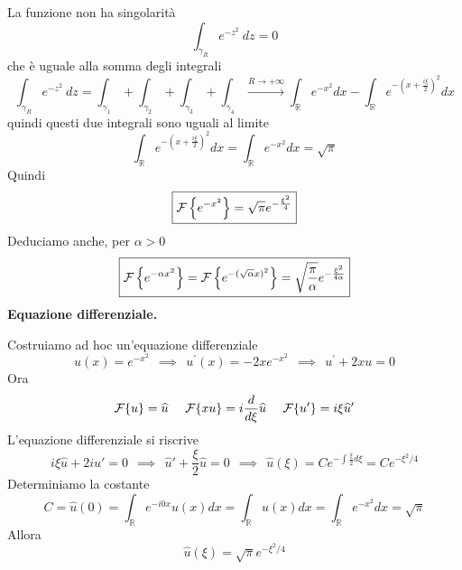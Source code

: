 La funzione non ha singolarità
\begin{equation*}
\int _{\gamma _{R}} e^{-z^{2}} \ dz=0
\end{equation*}
che è uguale alla somma degli integrali
\begin{equation*}
\int _{\gamma _{R}} e^{-z^{2}} \ dz=\int _{\gamma _{1}} +\int _{\gamma _{2}} +\int _{\gamma _{3}} +\int _{\gamma _{4}}\xrightarrow{R\rightarrow +\infty }\int _{\mathbb{R}} e^{-x^{2}} dx-\int _{\mathbb{R}} e^{-\left( x+\frac{i\xi }{2}\right)^{2}} dx
\end{equation*}
quindi questi due integrali sono uguali al limite
\begin{equation*}
\int _{\mathbb{R}} e^{-\left( x+\frac{i\xi }{2}\right)^{2}} dx=\int _{\mathbb{R}} e^{-x^{2}} dx=\sqrt{\pi }
\end{equation*}
Quindi
\begin{equation*}
\boxed{\mathcal{F} \left\{e^{-x^{2}}\right\} =\sqrt{\pi } e^{-\frac{\xi ^{2}}{4}}}
\end{equation*}
Deduciamo anche, per $\alpha  >0$
\begin{equation*}
\boxed{\mathcal{F} \left\{e^{-\alpha x^{2}}\right\} =\mathcal{F} \left\{e^{-(\sqrt{\alpha } x)^{2}}\right\} =\sqrt{\frac{\pi }{\alpha }} e^{-\frac{\xi ^{2}}{4\alpha }}}
\end{equation*}
\textbf{Equazione differenziale.}

Costruiamo ad hoc un'equazione differenziale
\begin{equation*}
u(x)=e^{-x^{2}} \ \ \implies \ \ u^{'} (x)=-2xe^{-x^{2}} \ \ \implies \ \ u^{'} +2xu=0
\end{equation*}
Ora
\begin{equation*}
\mathcal{F} \{u\} =\widehat{u} \ \ \ \ \mathcal{F} \{xu\} =i\frac{d}{d\xi }\widehat{u} \ \ \ \ \mathcal{F} \{u'\} =i\xi \widehat{u} '
\end{equation*}
L'equazione differenziale si riscrive
\begin{equation*}
i\xi \hat{u} +2i\hat{u} '=0\ \ \implies \ \ \hat{u} '+\frac{\xi }{2}\hat{u} =0\ \ \implies \ \ \hat{u}( \xi ) =Ce^{-\int \frac{\xi }{2} d\xi } =Ce^{-\xi ^{2} /4}
\end{equation*}
Determiniamo la costante
\begin{equation*}
C=\hat{u}( 0) =\int _{\mathbb{R}} e^{-i0x} u( x) dx=\int _{\mathbb{R}} u( x) dx=\int _{\mathbb{R}} e^{-x^{2}} dx=\sqrt{\pi }
\end{equation*}
Allora
\begin{equation*}
\boxed{\hat{u}( \xi ) =\sqrt{\pi } e^{-\xi ^{2} /4}}
\end{equation*}
\Soluzione

